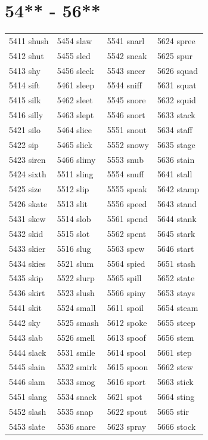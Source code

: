\documentclass[12pt, oneside]{book}
\begin{document}
	\begin{table}[h]
		\centering
		\section*{54** - 56**}
		\begin{tabular}{l l l l}
			5411 shush & 5454 slaw & 5541 snarl & 5624 spree\\
			5412 shut & 5455 sled & 5542 sneak & 5625 spur\\
			5413 shy & 5456 sleek & 5543 sneer & 5626 squad\\
			5414 sift & 5461 sleep & 5544 sniff & 5631 squat\\
			5415 silk & 5462 sleet & 5545 snore & 5632 squid\\
			5416 silly & 5463 slept & 5546 snort & 5633 stack\\
			5421 silo & 5464 slice & 5551 snout & 5634 staff\\
			5422 sip & 5465 slick & 5552 snowy & 5635 stage\\
			5423 siren & 5466 slimy & 5553 snub & 5636 stain\\
			5424 sixth & 5511 sling & 5554 snuff & 5641 stall\\
			5425 size & 5512 slip & 5555 speak & 5642 stamp\\
			5426 skate & 5513 slit & 5556 speed & 5643 stand\\
			5431 skew & 5514 slob & 5561 spend & 5644 stank\\
			5432 skid & 5515 slot & 5562 spent & 5645 stark\\
			5433 skier & 5516 slug & 5563 spew & 5646 start\\
			5434 skies & 5521 slum & 5564 spied & 5651 stash\\
			5435 skip & 5522 slurp & 5565 spill & 5652 state\\
			5436 skirt & 5523 slush & 5566 spiny & 5653 stays\\
			5441 skit & 5524 small & 5611 spoil & 5654 steam\\
			5442 sky & 5525 smash & 5612 spoke & 5655 steep\\
			5443 slab & 5526 smell & 5613 spoof & 5656 stem\\
			5444 slack & 5531 smile & 5614 spool & 5661 step\\
			5445 slain & 5532 smirk & 5615 spoon & 5662 stew\\
			5446 slam & 5533 smog & 5616 sport & 5663 stick\\
			5451 slang & 5534 snack & 5621 spot & 5664 sting\\
			5452 slash & 5535 snap & 5622 spout & 5665 stir\\
			5453 slate & 5536 snare & 5623 spray & 5666 stock\\
			
			
		\end{tabular}
	\end{table}
	
\end{document}
